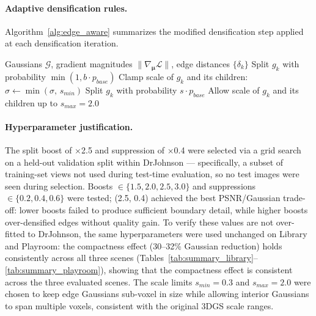 \paragraph{Adaptive densification rules.}
Algorithm~\ref{alg:edge_aware} summarizes the modified densification step applied at each densification iteration.

\begin{algorithm}[h]
\caption{Edge-Aware Adaptive Densification}
\label{alg:edge_aware}
\begin{algorithmic}[1]
\Require Gaussians $\mathcal{G}$, gradient magnitudes $\|\nabla_{\boldsymbol{\mu}}\mathcal{L}\|$, edge distances $\{\delta_k\}$
\State {}
\State {}
     
        \State Split $g_k$ with probability $\min(1, b \cdot p_{base})$ 
        \State Clamp scale of $g_k$ and its children: $\sigma \leftarrow \min(\sigma,\, s_{min})$ 
    \Else {}
        \State Split $g_k$ with probability $s \cdot p_{base}$ 
        \State Allow scale of $g_k$ and its children up to $s_{max} = 2.0$ 
    \EndIf
\EndFor
\end{algorithmic}
\end{algorithm}

\paragraph{Hyperparameter justification.}
The split boost of $\times$2.5 and suppression of $\times$0.4 were selected via a grid search on a held-out validation split within DrJohnson — specifically, a subset of training-set views not used during test-time evaluation, so no test images were seen during selection. Boosts $\in \{1.5, 2.0, 2.5, 3.0\}$ and suppressions $\in \{0.2, 0.4, 0.6\}$ were tested; (2.5, 0.4) achieved the best PSNR/Gaussian trade-off: lower boosts failed to produce sufficient boundary detail, while higher boosts over-densified edges without quality gain. To verify these values are not over-fitted to DrJohnson, the same hyperparameters were used unchanged on Library and Playroom: the compactness effect (30--32\% Gaussian reduction) holds consistently across all three scenes (Tables~\ref{tab:summary_library}--\ref{tab:summary_playroom}), showing that the compactness effect is consistent across the three evaluated scenes. The scale limits $s_{min} = 0.3$ and $s_{max} = 2.0$ were chosen to keep edge Gaussians sub-voxel in size while allowing interior Gaussians to span multiple voxels, consistent with the original 3DGS scale ranges.

